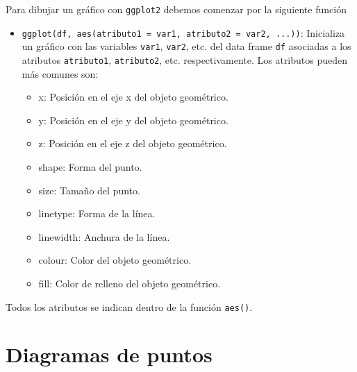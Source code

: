 \documentclass[
  a4paper,
]{scrreport}
\providecommand{\tightlist}{%
  \setlength{\itemsep}{0pt}\setlength{\parskip}{0pt}}\usepackage{longtable,booktabs,array}
\theoremstyle{definition}
\theoremstyle{definition}
\theoremstyle{remark}
\begin{document}
Para dibujar un gráfico con \texttt{ggplot2} debemos comenzar por la
siguiente función

\begin{itemize}
\tightlist
\item
  \texttt{ggplot(df,\ aes(atributo1\ =\ var1,\ atributo2\ =\ var2,\ ...))}:
  Inicializa un gráfico con las variables \texttt{var1}, \texttt{var2},
  etc. del data frame \texttt{df} asociadas a los atributos
  \texttt{atributo1}, \texttt{atributo2}, etc. respectivamente. Los
  atributos pueden más comunes son:

  \begin{itemize}
  \tightlist
  \item
    x: Posición en el eje x del objeto geométrico.
  \item
    y: Posición en el eje y del objeto geométrico.
  \item
    z: Posición en el eje z del objeto geométrico.
  \item
    shape: Forma del punto.
  \item
    size: Tamaño del punto.
  \item
    linetype: Forma de la línea.
  \item
    linewidth: Anchura de la línea.
  \item
    colour: Color del objeto geométrico.
  \item
    fill: Color de relleno del objeto geométrico.
  \end{itemize}
\end{itemize}

\begin{tcolorbox}[enhanced jigsaw, title=\textcolor{quarto-callout-important-color}{\faExclamation}\hspace{0.5em}{Importante}, titlerule=0mm, toprule=.15mm, colbacktitle=quarto-callout-important-color!10!white, arc=.35mm, colframe=quarto-callout-important-color-frame, opacitybacktitle=0.6, coltitle=black, left=2mm, colback=white, opacityback=0, breakable, bottomrule=.15mm, toptitle=1mm, leftrule=.75mm, bottomtitle=1mm, rightrule=.15mm]

Todos los atributos se indican dentro de la función \texttt{aes()}.

\end{tcolorbox}

\section{Diagramas de puntos}\label{diagramas-de-puntos}
\end{document}
